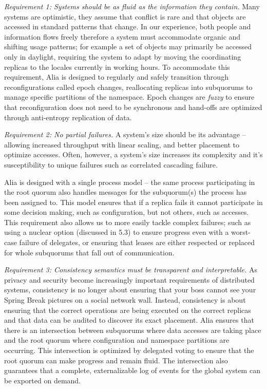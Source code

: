 \documentclass[11pt,conference]{IEEEtran}
\begin{document}
\emph{Requirement 1: Systems should be as fluid as the information they contain.}
Many systems are optimistic, they assume that conflict is rare and that objects are
accessed in standard patterns that change.
In our experience, both people and information flows freely therefore a system must
accommodate organic and shifting usage patterns; for example a set of objects may
primarily be accessed only in daylight, requiring the system to adapt by moving the
coordinating replicas to the locales currently in working hours.
To accommodate this requirement, Alia is designed to regularly and safely transition
through reconfigurations called epoch changes, reallocating replicas into subquorums
to manage specific partitions of the namespace.
Epoch changes are \emph{fuzzy} to ensure that reconfiguration does not need to be
synchronous and hand-offs are optimized through anti-entropy replication of data.

\emph{Requirement 2: No partial failures.}
A system's size should be its advantage -- allowing increased throughput with linear
scaling, and better placement to optimize accesses.
Often, however, a system's size increases its complexity and it's susceptibility
to unique failures such as correlated cascading failure.

Alia is designed with a single process model -- the same process participating in
the root quorum also handles messages for the subquorum(s) the process has been
assigned to.
This model ensures that if a replica fails it cannot participate in some decision
making, such as configuration, but not others, such as accesses.
This requirement also allows us to more easily tackle complex failures; such as
using a nuclear option (discussed in 5.3) to ensure progress even with a worst-case
failure of delegates, or ensuring that leases are either respected or replaced
for whole subquorums that fall out of communication.

\emph{Requirement 3: Consistency semantics must be transparent and interpretable.}
As privacy and security become increasingly important requirements of distributed
systems, consistency is no longer about ensuring that your boss cannot see your
Spring Break pictures on a social network wall.
Instead, consistency is about ensuring that the correct operations are being
executed on the correct replicas and that data can be audited to discover its
exact placement.
Alia ensures that there is an intersection between subquorums where data accesses
are taking place and the root quorum where configuration and namespace partitions
are occurring.
This intersection is optimized by delegated voting to ensure that the root
quorum can make progress and remain fluid.
The intersection also guarantees that a complete, externalizable log of events
for the global system can be exported on demand.
\end{document}
